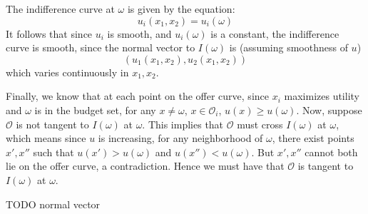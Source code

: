 \documentclass[10pt,letter]{article}
\begin{document}
The indifference curve at $\omega$ is given by the equation:
\[ u_i(x_1, x_2) = u_i(\omega) \]
It follows that since $u_i$ is smooth, and $u_i(\omega)$ is a constant, the indifference curve is smooth, since the normal vector to $I(\omega)$ is (assuming smoothness of $u$)
\[ (u_1(x_1, x_2), u_2(x_1, x_2)) \]
which varies continuously in $x_1, x_2$.

Finally, we know that at each point on the offer curve, since $x_i$ maximizes utility and $\omega$ is in the budget set, for any $x \neq \omega$, $x \in \mathcal{O}_i$, $u(x) \ge u(\omega)$. Now, suppose $\mathcal{O}$ is not tangent to $I(\omega)$ at $\omega$. This implies that $\mathcal{O}$ must cross $I(\omega)$ at $\omega$, which means since $u$ is increasing, for any neighborhood of $\omega$, there exist points $x', x''$ such that $u(x') > u(\omega)$ and $u(x'') < u(\omega)$. But $x', x''$ cannot both lie on the offer curve, a contradiction. Hence we must have that $\mathcal{O}$ is tangent to $I(\omega)$ at $\omega$.

TODO normal vector
\end{document}
